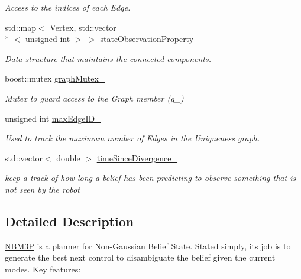 \begin{DoxyCompactItemize}
\begin{DoxyCompactList}\small\item\em Access to the indices of each Edge. \end{DoxyCompactList}\item 
std\-::map$<$ Vertex, std\-::vector\\*
$<$ unsigned int $>$ $>$ \hyperlink{class_n_b_m3_p_a3dc2afc2ddf851a7e31e0f3d6e21c6d9}{state\-Observation\-Property\-\_\-}
\begin{DoxyCompactList}\small\item\em Data structure that maintains the connected components. \end{DoxyCompactList}\item 
\hypertarget{class_n_b_m3_p_a12d28b9df3354265002914a2c39244d9}{boost\-::mutex \hyperlink{class_n_b_m3_p_a12d28b9df3354265002914a2c39244d9}{graph\-Mutex\-\_\-}}\label{class_n_b_m3_p_a12d28b9df3354265002914a2c39244d9}

\begin{DoxyCompactList}\small\item\em Mutex to guard access to the Graph member (g\-\_\-) \end{DoxyCompactList}\item 
\hypertarget{class_n_b_m3_p_aa9fa80663a9f07dbd9f70436c612c2fe}{unsigned int \hyperlink{class_n_b_m3_p_aa9fa80663a9f07dbd9f70436c612c2fe}{max\-Edge\-I\-D\-\_\-}}\label{class_n_b_m3_p_aa9fa80663a9f07dbd9f70436c612c2fe}

\begin{DoxyCompactList}\small\item\em Used to track the maximum number of Edges in the Uniqueness graph. \end{DoxyCompactList}\item 
\hypertarget{class_n_b_m3_p_a27fd0532feff16fc90da8cf3fcfc394d}{std\-::vector$<$ double $>$ \hyperlink{class_n_b_m3_p_a27fd0532feff16fc90da8cf3fcfc394d}{time\-Since\-Divergence\-\_\-}}\label{class_n_b_m3_p_a27fd0532feff16fc90da8cf3fcfc394d}

\begin{DoxyCompactList}\small\item\em keep a track of how long a belief has been predicting to observe something that is not seen by the robot \end{DoxyCompactList}\end{DoxyCompactItemize}


\subsection{Detailed Description}
\hyperlink{class_n_b_m3_p}{N\-B\-M3\-P} is a planner for Non-\/\-Gaussian Belief State. Stated simply, its job is to generate the best next control to disambiguate the belief given the current modes. Key features\-:

